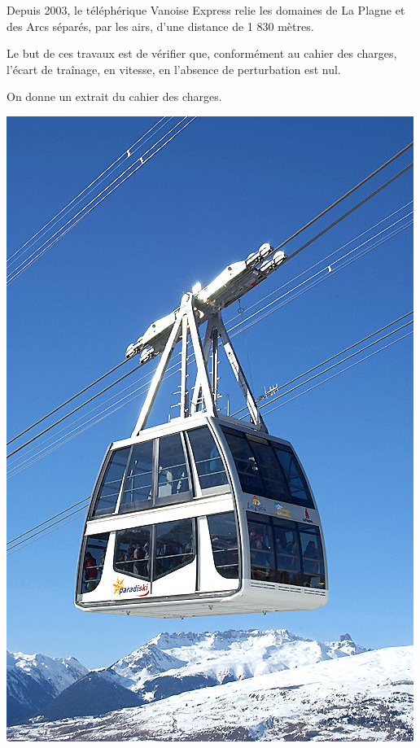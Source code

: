 \documentclass[10pt]{article}
\begin{document}
\begin{minipage}[c]{.8\linewidth}
Depuis 2003, le téléphérique Vanoise Express relie les domaines de La Plagne et des Arcs séparés, par les airs, d'une distance de 1 830 mètres.
\begin{obj} 
Le but de ces travaux est de vérifier que, conformément au cahier des charges, l'écart de traînage, en vitesse, en l'absence de perturbation est nul. 
\end{obj}

 On donne un extrait du cahier des charges.
 
\end{minipage} \hfill
\begin{minipage}[c]{.15\linewidth}
\begin{center}
\includegraphics[width=\textwidth]{images/ve}
\end{center}
\end{minipage}
\end{document}

